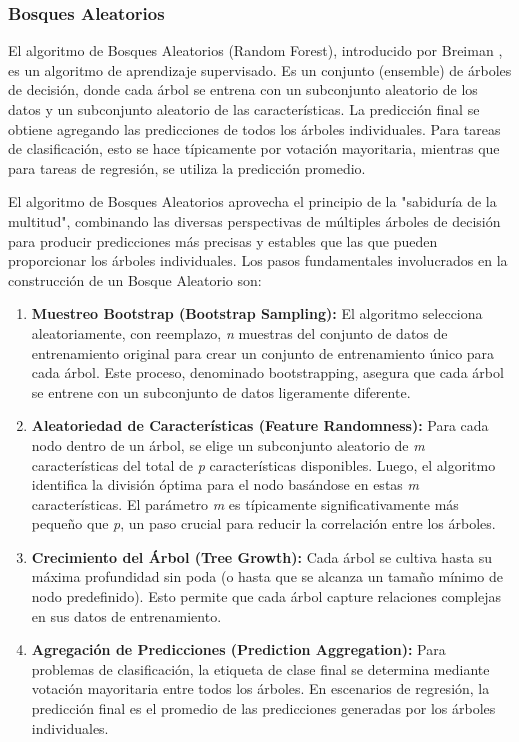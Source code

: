 \subsubsection{Bosques Aleatorios}
El algoritmo de Bosques Aleatorios (Random Forest), introducido por Breiman \cite{breiman2001random}, es un algoritmo de aprendizaje supervisado.
Es un conjunto (ensemble) de árboles de decisión, donde cada árbol se entrena con un subconjunto aleatorio de los datos y un subconjunto aleatorio de las características.
La predicción final se obtiene agregando las predicciones de todos los árboles individuales.
Para tareas de clasificación, esto se hace típicamente por votación mayoritaria, mientras que para tareas de regresión, se utiliza la predicción promedio.

El algoritmo de Bosques Aleatorios aprovecha el principio de la "sabiduría de la multitud", combinando las diversas perspectivas de múltiples árboles de decisión para producir predicciones más precisas y estables que las que pueden proporcionar los árboles individuales.
Los pasos fundamentales involucrados en la construcción de un Bosque Aleatorio son:

\begin{enumerate}
    \item \textbf{Muestreo Bootstrap (Bootstrap Sampling):} El algoritmo selecciona aleatoriamente, con reemplazo, \textit{n} muestras del conjunto de datos de entrenamiento original para crear un conjunto de entrenamiento único para cada árbol.
    Este proceso, denominado bootstrapping, asegura que cada árbol se entrene con un subconjunto de datos ligeramente diferente.
    \item \textbf{Aleatoriedad de Características (Feature Randomness):} Para cada nodo dentro de un árbol, se elige un subconjunto aleatorio de \textit{m} características del total de \textit{p} características disponibles.
    Luego, el algoritmo identifica la división óptima para el nodo basándose en estas \textit{m} características.
    El parámetro \textit{m} es típicamente significativamente más pequeño que \textit{p}, un paso crucial para reducir la correlación entre los árboles.
    \item \textbf{Crecimiento del Árbol (Tree Growth):} Cada árbol se cultiva hasta su máxima profundidad sin poda (o hasta que se alcanza un tamaño mínimo de nodo predefinido).
    Esto permite que cada árbol capture relaciones complejas en sus datos de entrenamiento.
    \item \textbf{Agregación de Predicciones (Prediction Aggregation):} Para problemas de clasificación, la etiqueta de clase final se determina mediante votación mayoritaria entre todos los árboles.
    En escenarios de regresión, la predicción final es el promedio de las predicciones generadas por los árboles individuales.
\end{enumerate}

